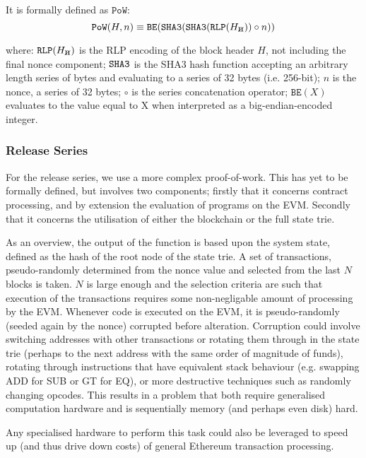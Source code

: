 \documentclass[9pt,oneside]{amsart}
\newcommand{\hcancel}[1]{%
    \tikz[baseline=(tocancel.base)]{
        \node[inner sep=0pt,outer sep=0pt] (tocancel) {#1};
        \draw[black] (tocancel.south west) -- (tocancel.north east);
    }%
}%
\begin{document}
\begin{multicols}{2}
It is formally defined as $\mathtt{PoW}$:
\begin{equation}
\mathtt{PoW}(H, n) \equiv \mathtt{BE}(\mathtt{\tiny SHA3}(\mathtt{\tiny SHA3}(\mathtt{\tiny RLP}(H_{\hcancel{n}})) \circ n))
\end{equation}

where:
$\mathtt{\tiny RLP}(H_{\hcancel{n}})$ is the RLP encoding of the block header $H$, not including the final nonce component;
$\mathtt{\tiny SHA3}$ is the SHA3 hash function accepting an arbitrary length series of bytes and evaluating to a series of 32 bytes (i.e. 256-bit);
$n$ is the nonce, a series of 32 bytes;
$\circ$ is the series concatenation operator;
$\mathtt{BE}(X)$ evaluates to the value equal to X when interpreted as a big-endian-encoded integer.

\subsubsection{Release Series}

For the release series, we use a more complex proof-of-work. This has yet to be formally defined, but involves two components; firstly that it concerns contract processing, and by extension the evaluation of programs on the EVM. Secondly that it concerns the utilisation of either the blockchain or the full state trie.

As an overview, the output of the function is based upon the system state, defined as the hash of the root node of the state trie. A set of transactions, pseudo-randomly determined from the nonce value and selected from the last $N$ blocks is taken. $N$ is large enough and the selection criteria are such that execution of the transactions requires some non-negligable amount of processing by the EVM. Whenever code is executed on the EVM, it is pseudo-randomly (seeded again by the nonce) corrupted before alteration. Corruption could involve switching addresses with other transactions or rotating them through in the state trie (perhaps to the next address with the same order of magnitude of funds), rotating through instructions that have equivalent stack behaviour (e.g. swapping {\small ADD} for {\small SUB} or {\small GT} for {\small EQ}), or more destructive techniques such as randomly changing opcodes. This results in a problem that both require generalised computation hardware and is sequentially memory (and perhaps even disk) hard.

Any specialised hardware to perform this task could also be leveraged to speed up (and thus drive down costs) of general Ethereum transaction processing.


\end{multicols}
\end{document}
